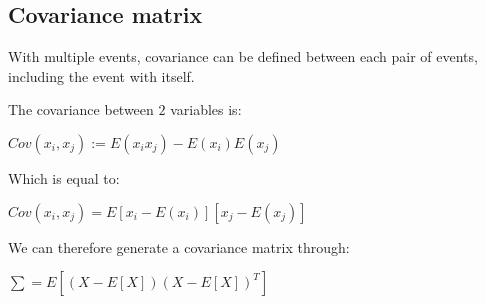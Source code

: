 
\subsection{Covariance matrix}

With multiple events, covariance can be defined between each pair of events, including the event with itself.

The covariance between \(2\) variables is:

\(Cov(x_i,x_j):=E(x_ix_j)-E(x_i)E(x_j)\)

Which is equal to:

\(Cov(x_i,x_j)=E{[x_i-E(x_i)][x_j-E(x_j)]}\)

We can therefore generate a covariance matrix through:

\(\sum =E[(X-E[X])(X-E[X])^T]\)

